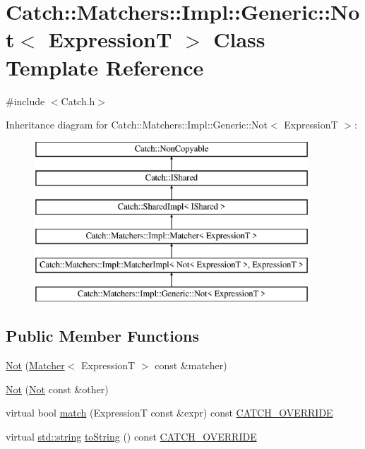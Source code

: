 \hypertarget{class_catch_1_1_matchers_1_1_impl_1_1_generic_1_1_not}{}\section{Catch\+:\+:Matchers\+:\+:Impl\+:\+:Generic\+:\+:Not$<$ ExpressionT $>$ Class Template Reference}
\label{class_catch_1_1_matchers_1_1_impl_1_1_generic_1_1_not}


{\ttfamily \#include $<$Catch.\+h$>$}

Inheritance diagram for Catch\+:\+:Matchers\+:\+:Impl\+:\+:Generic\+:\+:Not$<$ ExpressionT $>$\+:\begin{figure}[H]
\begin{center}
\leavevmode
\includegraphics[height=6.000000cm]{class_catch_1_1_matchers_1_1_impl_1_1_generic_1_1_not}
\end{center}
\end{figure}
\subsection*{Public Member Functions}
\begin{DoxyCompactItemize}
\item 
\hyperlink{class_catch_1_1_matchers_1_1_impl_1_1_generic_1_1_not_a9b99e3ce49c1a16931708b67c312f204}{Not} (\hyperlink{struct_catch_1_1_matchers_1_1_impl_1_1_matcher}{Matcher}$<$ ExpressionT $>$ const \&matcher)
\item 
\hyperlink{class_catch_1_1_matchers_1_1_impl_1_1_generic_1_1_not_a46eccbbaeec259d3536aa2a29f95208f}{Not} (\hyperlink{class_catch_1_1_matchers_1_1_impl_1_1_generic_1_1_not}{Not} const \&other)
\item 
virtual bool \hyperlink{class_catch_1_1_matchers_1_1_impl_1_1_generic_1_1_not_a18c49fc6fb73a42d54650dafc18c7db1}{match} (ExpressionT const \&expr) const \hyperlink{_catch_8h_a8ecdce4d3f57835f707915ae831eb847}{C\+A\+T\+C\+H\+\_\+\+O\+V\+E\+R\+R\+I\+DE}
\item 
virtual \hyperlink{_s_d_l__opengl__glext_8h_ae84541b4f3d8e1ea24ec0f466a8c568b}{std\+::string} \hyperlink{class_catch_1_1_matchers_1_1_impl_1_1_generic_1_1_not_ab970a4a6e58a987451e0b0e0e60a0bff}{to\+String} () const \hyperlink{_catch_8h_a8ecdce4d3f57835f707915ae831eb847}{C\+A\+T\+C\+H\+\_\+\+O\+V\+E\+R\+R\+I\+DE}
\end{DoxyCompactItemize}
